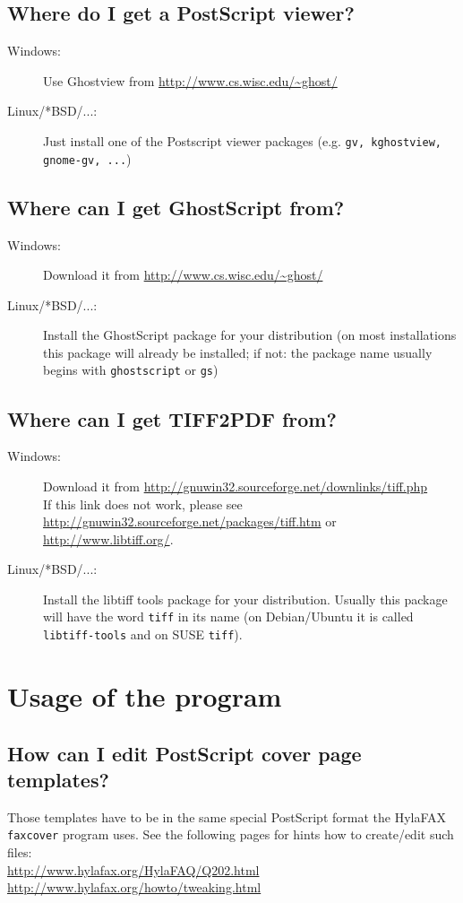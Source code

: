 \documentclass[a4paper,10pt]{scrartcl}
\begin{document}
\subsection{Where do I get a PostScript viewer?}
\begin{description}
\item[Windows:] Use Ghostview from \url{http://www.cs.wisc.edu/~ghost/}
\item[Linux/*BSD/...:] Just install one of the Postscript viewer packages
                (e.g. \texttt{gv, kghostview, gnome-gv, ...})
\end{description}

\subsection{Where can I get GhostScript from?}
\begin{description}
\item[Windows:] Download it from \url{http://www.cs.wisc.edu/~ghost/}
\item[Linux/*BSD/...:] Install the GhostScript package for your distribution (on most installations this package will already be installed; if not: the package name usually begins with \texttt{ghostscript} or \texttt{gs})
\end{description}

\subsection{Where can I get TIFF2PDF from?}
\begin{description}
\item[Windows:] Download it from \url{http://gnuwin32.sourceforge.net/downlinks/tiff.php}\\ If this link does not work, please see \url{http://gnuwin32.sourceforge.net/packages/tiff.htm} or \url{http://www.libtiff.org/}.
\item[Linux/*BSD/...:] Install the libtiff tools package for your distribution. Usually this package will have the word \texttt{tiff} in its name (on Debian/Ubuntu it is called \texttt{libtiff-tools} and on SUSE \texttt{tiff}).
\end{description}

\section{Usage of the program}	

\subsection{How can I edit PostScript cover page templates?}
Those templates have to be in the same special PostScript format the HylaFAX
\texttt{faxcover} program uses. See the following pages for hints how to create/edit
such files: \\
\url{http://www.hylafax.org/HylaFAQ/Q202.html}\\
\url{http://www.hylafax.org/howto/tweaking.html}\\
\end{document}

